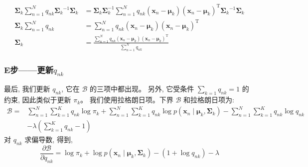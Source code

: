 \documentclass[UTF8]{ctexart}
\numberwithin{equation}{section}
\begin{document}
$$
\begin{aligned}
\boldsymbol{\Sigma}_{k} \sum_{n=1}^{N} q_{n k} \boldsymbol{\Sigma}_{k}{ }^{-1} \boldsymbol{\Sigma}_{k} &=\boldsymbol{\Sigma}_{k} \boldsymbol{\Sigma}_{k}^{-1} \sum_{n=1}^{N} q_{n k}\left(\boldsymbol{x}_{n}-\boldsymbol{\mu}_{k}\right)\left(\boldsymbol{x}_{n}-\boldsymbol{\mu}_{k}\right)^{\mathrm{T}} \boldsymbol{\Sigma}_{k}{ }^{-1} \boldsymbol{\Sigma}_{k} \\
\boldsymbol{\Sigma}_{k} \sum_{n=1}^{N} q_{n k} &=\sum_{n=1}^{N} q_{n k}\left(\boldsymbol{x}_{n}-\boldsymbol{\mu}_{k}\right)\left(\boldsymbol{x}_{n}-\boldsymbol{\mu}_{k}\right)^{\mathrm{T}} \\
\boldsymbol{\Sigma}_{k} &=\frac{\sum_{n=1}^{N} q_{n k}\left(\boldsymbol{x}_{n}-\boldsymbol{\mu}_{k}\right)\left(\boldsymbol{x}_{n}-\boldsymbol{\mu}_{k}\right)^{\mathrm{T}}}{\sum_{n=1}^{N} q_{n k}}
\end{aligned}
$$

\subsubsection{E步——更新$q_{nk}$}
最后, 我们更新 $q_{n k}$, 它在 $\mathcal{B}$ 的三项中都出现。
另外, 它受条件 $\sum_{k=1} q_{n k}=1$ 的约束, 因此类似于更新 $\pi_{k}$。
我们使用拉格朗日项。下界 $\mathcal{B}$ 和拉格朗日项为:
$$
\begin{aligned}
\mathcal{B}=& \sum_{n=1}^{N} \sum_{k=1}^{K} q_{n k} \log \pi_{k}+\sum_{n=1}^{N} \sum_{k=1}^{K} q_{n k} \log p\left(\boldsymbol{x}_{n} \mid \boldsymbol{\mu}_{k}, \boldsymbol{\Sigma}_{k}\right)-\sum_{n=1}^{N} \sum_{k=1}^{K} q_{n k} \log q_{n k} \\
&-\lambda\left(\sum_{k=1}^{K} q_{n k}-1\right)
\end{aligned}
$$
对 $q_{n k}$ 求偏导数, 得到,
$$
\frac{\partial \mathcal{B}}{\partial q_{n k}}=\log \pi_{k}+\log p\left(\boldsymbol{x}_{n} \mid \boldsymbol{\mu}_{k}, \boldsymbol{\Sigma}_{k}\right)-\left(1+\log q_{n k}\right)-\lambda
$$
\end{document}
